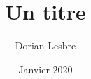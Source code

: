 \documentclass[12pt,a4paper]{article}
\title{Un titre}
\author{Dorian Lesbre}
\date{Janvier 2020}
\begin{document}
\maketitle




\nocite{*}


\end{document}
